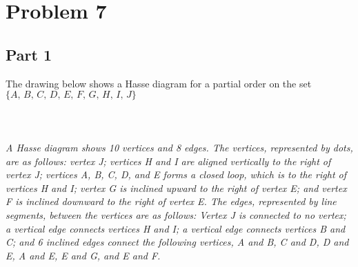 \documentclass{amsart}
\theoremstyle{definition}
\theoremstyle{Exercise}
\theoremstyle{remark}
\theoremstyle{rule}
\numberwithin{equation}{section}
\begin{document}
 \newpage
\vspace*{0.25in}
\section*{Problem 7}
\subsection*{Part 1} The drawing below shows a Hasse diagram for a partial order on the set $\{A,\, B,\, C,\, D,\, E,\, F,\, G,\, H,\, I,\, J\}$
\\
\\
\\
\\
{\color{blue}{\bf Figure 3:} \emph{A Hasse diagram shows 10 vertices and 8 edges. The vertices, represented by dots, are as follows: vertex J; vertices H and I are aligned vertically to the right of vertex J; vertices A, B, C, D, and E forms a closed loop, which is to the right of vertices H and I; vertex G is inclined upward to the right of vertex E; and vertex F is inclined downward to the right of vertex E. The edges, represented by line segments, between the vertices are as follows: Vertex J is connected to no vertex; a vertical edge connects vertices H and I; a vertical edge connects vertices B and C; and 6 inclined edges connect the following vertices, A and B, C and D, D and E, A and E, E and G, and E and F.
}
}
\\
\\
\end{document}
